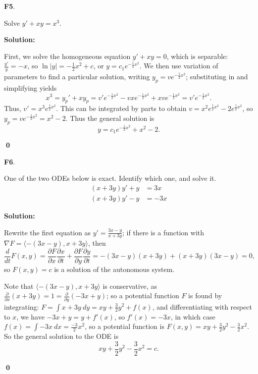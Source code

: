 \documentclass{article}
\newenvironment{problem}[1]
{
  \begin{flushleft}
  \textbf{#1}.
  \ignorespaces
}
{
  \end{flushleft}
}
\newenvironment{solution}
{
  \ignorespaces
  \textbf{Solution:}
}
{
  \ignorespacesafterend
  \begin{flushright}
  {\bfseries \qed}
  \end{flushright}
}
\begin{document}
\begin{problem}{F5}
Solve \(y'+xy=x^3\).
\end{problem}
\begin{solution}
First, we solve the homogeneous equation \(y'+xy=0\), which is separable: \(\frac{y'}{y}=-x\), so \(\ln|y|=-\frac{1}{2}x^2+c\), or \(y=c_1e^{-\frac{1}{2}x^2}\). We then use variation of parameters to find a particular solution, writing \(y_p = v e^{-\frac{1}{2}x^2}\); substituting in and simplifying yields
\[x^3 = y_p ' +xy_p = v'e^{-\frac{1}{2}x^2} -vxe^{-\frac{1}{2}x^2} + xve^{-\frac{1}{2}x^2} = v'e^{-\frac{1}{2}x^2}.\]
Thus, \(v'=x^3 e^{\frac{1}{2}x^2} \).  This can be integrated by parts to obtain \(v=x^2e^{\frac{1}{2}x^2}-2e^{\frac{1}{2}x^2}\), so \(y_p = v e^{-\frac{1}{2}x^2} = x^2-2\).  Thus the general solution is
\[y=c_1e^{-\frac{1}{2}x^2} + x^2 - 2 .\]
\end{solution}

\begin{problem}{F6}
One of the two ODEs below is exact.  Identify which one, and solve it.
\begin{align*}
 (x + 3y)y'+y &=3x \\ %
 (x + 3y)y'-y &=-3x  
\end{align*}
\end{problem}
\begin{solution}
Rewrite the first equation as \(y'=\frac{3x-y}{x+3y}\); if there is a function with \(\nabla F = \langle -(3x-y), x+3y\rangle\), then \[\frac{d}{dt}F(x,y)=\frac{\partial F}{\partial x} \frac{\partial x}{\partial t} + \frac{\partial F}{\partial y} \frac{\partial y}{\partial t} = -(3x-y)(x+3y)+(x+3y)(3x-y)=0,\] so \(F(x,y)=c\) is a solution of the autonomous system.

Note that  \(\langle -(3x-y), x+3y\rangle\) is conservative, as \(\frac{\partial}{\partial x}(x+3y)=1=\frac{\partial}{\partial y}(-3x+y)\); so a potential function \(F\) is found by integrating: \(F = \int x+3y\ dy = xy+\frac{3}{2}y^2+f(x) \), and differentiating with respect to \(x\), we have \(-3x+y=y+f'(x)\), so \(f'(x)=-3x\), in which case \(f(x)=\int -3x\ dx = \frac{-3}{2}x^2\), so a potential function is \(F(x,y)=xy+\frac{3}{2}y^2-\frac{3}{2}x^2\).  So the general solution to the ODE is
\[ xy+\frac{3}{2}y^2-\frac{3}{2}x^2 = c.\]
\end{solution}
\end{document}
